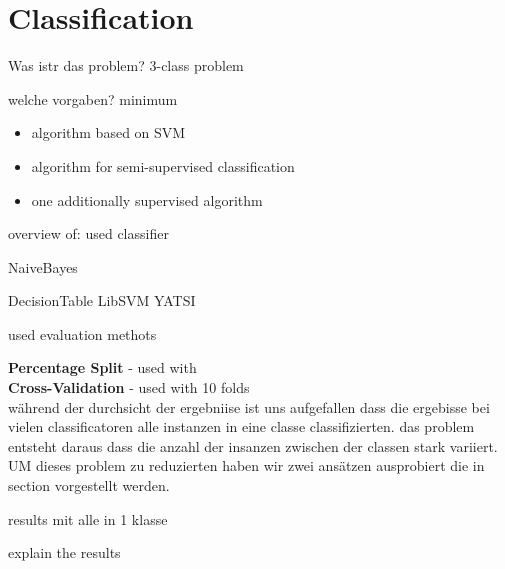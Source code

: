 \section{Classification}
\label{classification}

Was istr das problem?
3-class problem


welche vorgaben?
minimum
\begin{itemize}
	\item[\textbullet] algorithm based on SVM
	\item[\textbullet] algorithm for semi-supervised classification
	\item[\textbullet] one additionally supervised algorithm
\end{itemize}


overview of:
used classifier

NaiveBayes




DecisionTable
LibSVM
YATSI



used evaluation methots
 
 
\textbf{Percentage Split} - used with \\
\textbf{Cross-Validation} - used with 10 folds\\


während der durchsicht der ergebniise ist uns aufgefallen dass die ergebisse bei vielen classificatoren alle instanzen in eine classe classifizierten. das problem entsteht daraus dass die anzahl der insanzen zwischen der classen stark variiert.
UM dieses problem zu reduzierten haben wir zwei ansätzen ausprobiert die in section 
vorgestellt werden.





\begin{table}[h]
\label{table:resultsClassifiers}
\end{table}

results mit alle in 1 klasse

explain the results
